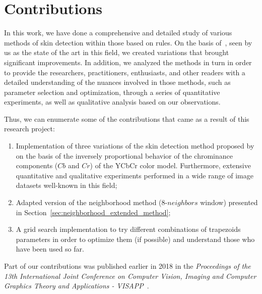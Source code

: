 \section{Contributions}
\label{sec:contributions}

In this work, we have done a comprehensive and detailed study of various methods of skin detection within those based on rules. On the basis of~\citet{brancati:17}, seen by us as the state of the art in this field, we created variations that brought significant improvements. In addition, we analyzed the methods in turn in order to provide the researchers, practitioners, enthusiasts, and other readers with a detailed understanding of the nuances involved in those methods, such as parameter selection and optimization, through a series of quantitative experiments, as well as qualitative analysis based on our observations.

Thus, we can enumerate some of the contributions that came as a result of this research project:
\begin{enumerate}
    \item Implementation of three variations of the skin detection method proposed by~\citet{brancati:17} on the basis of the inversely proportional behavior of the chrominance components ($Cb$ and $Cr$) of the YCbCr color model. Furthermore, extensive quantitative and qualitative experiments performed in a wide range of image datasets well-known in this field;
    \item Adapted version of the neighborhood method (8-$neighbors$ window) presented in Section~\ref{sec:neighborhood_extended_method};
    \item A grid search implementation to try different combinations of trapezoids parameters in order to optimize them (if possible) and understand those who have been used so far.
\end{enumerate}

Part of our contributions was published earlier in 2018 in the \emph{Proceedings of the 13th International Joint Conference on Computer Vision, Imaging and Computer Graphics Theory and Applications - VISAPP}~\citep{faria:18}.



